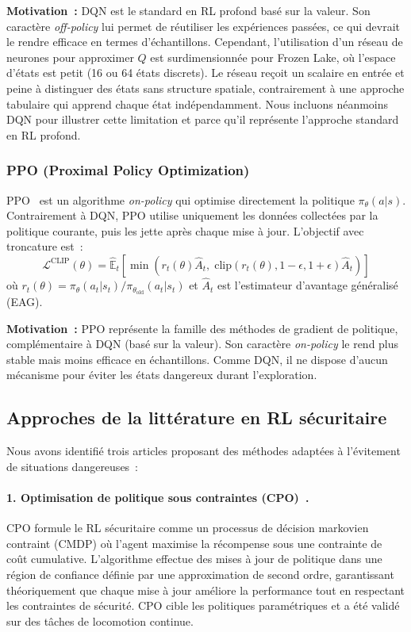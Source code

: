\documentclass{article}
\begin{document}
\textbf{Motivation~:} DQN est le standard en RL profond basé sur la valeur. Son caractère \textit{off-policy} lui permet de réutiliser les expériences passées, ce qui devrait le rendre efficace en termes d'échantillons. Cependant, l'utilisation d'un réseau de neurones pour approximer $Q$ est surdimensionnée pour Frozen Lake, où l'espace d'états est petit (16 ou 64 états discrets). Le réseau reçoit un scalaire en entrée et peine à distinguer des états sans structure spatiale, contrairement à une approche tabulaire qui apprend chaque état indépendamment. Nous incluons néanmoins DQN pour illustrer cette limitation et parce qu'il représente l'approche standard en RL profond.

\subsubsection{PPO (Proximal Policy Optimization)}

PPO~\cite{schulman2017proximal} est un algorithme \textit{on-policy} qui optimise directement la politique $\pi_\theta(a|s)$. Contrairement à DQN, PPO utilise uniquement les données collectées par la politique courante, puis les jette après chaque mise à jour. L'objectif avec troncature est~:
\begin{equation}
\mathcal{L}^{\text{CLIP}}(\theta) = \hat{\mathbb{E}}_t \left[ \min\left( r_t(\theta) \hat{A}_t, \; \text{clip}(r_t(\theta), 1{-}\epsilon, 1{+}\epsilon) \hat{A}_t \right) \right]
\end{equation}
où $r_t(\theta) = \pi_\theta(a_t|s_t) / \pi_{\theta_{\text{old}}}(a_t|s_t)$ et $\hat{A}_t$ est l'estimateur d'avantage généralisé (EAG).

\textbf{Motivation~:} PPO représente la famille des méthodes de gradient de politique, complémentaire à DQN (basé sur la valeur). Son caractère \textit{on-policy} le rend plus stable mais moins efficace en échantillons. Comme DQN, il ne dispose d'aucun mécanisme pour éviter les états dangereux durant l'exploration.

\subsection{Approches de la littérature en RL sécuritaire}

Nous avons identifié trois articles proposant des méthodes adaptées à l'évitement de situations dangereuses~:

\paragraph{1. Optimisation de politique sous contraintes (CPO)~\cite{achiam2017constrained}.} CPO formule le RL sécuritaire comme un processus de décision markovien contraint (CMDP) où l'agent maximise la récompense sous une contrainte de coût cumulative. L'algorithme effectue des mises à jour de politique dans une région de confiance définie par une approximation de second ordre, garantissant théoriquement que chaque mise à jour améliore la performance tout en respectant les contraintes de sécurité. CPO cible les politiques paramétriques et a été validé sur des tâches de locomotion continue.
\end{document}
